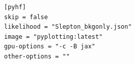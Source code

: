 \documentclass{article}
\newcommand{\toml}{\textsc{toml}}
\begin{document}
\begin{listing}[H]
	\begin{verbatim}
[pyhf]
skip = false
likelihood = "Slepton_bkgonly.json"
image = "pyplotting:latest"
gpu-options = "-c -B jax"
other-options = ""
  \end{verbatim}
	\caption{The \texttt{pyhf} block of an example \toml{} configuration file for generating slepton events.}
	\label{slepton-config-pyhf}
\end{listing}
\end{document}

